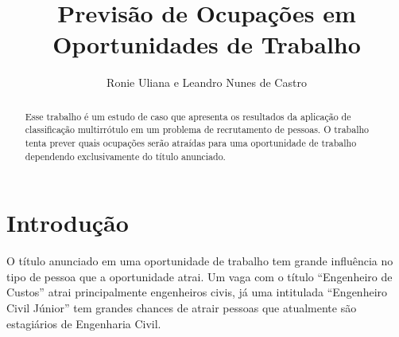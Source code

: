 \documentclass[runningheads,a4paper]{llncs}
\begin{document}


\title{Previsão de Ocupações em Oportunidades de Trabalho}

\author{
	Ronie Uliana e Leandro Nunes de Castro
}

%

			
\maketitle

\begin{abstract}
Esse trabalho é um estudo de caso que apresenta os resultados da aplicação de classificação multirrótulo em um problema de recrutamento de pessoas. O trabalho tenta prever quais ocupações serão atraídas para uma oportunidade de trabalho dependendo exclusivamente do título anunciado.
\end{abstract}


\section{Introdução} \label{sec:intro}

O título anunciado em uma oportunidade de trabalho tem grande influência no tipo de pessoa que a oportunidade atrai. Um vaga com o título \enquote{Engenheiro de Custos} atrai principalmente engenheiros civis, já uma intitulada \enquote{Engenheiro Civil Júnior} tem grandes chances de atrair pessoas que atualmente são estagiários de Engenharia Civil.
\end{document}

